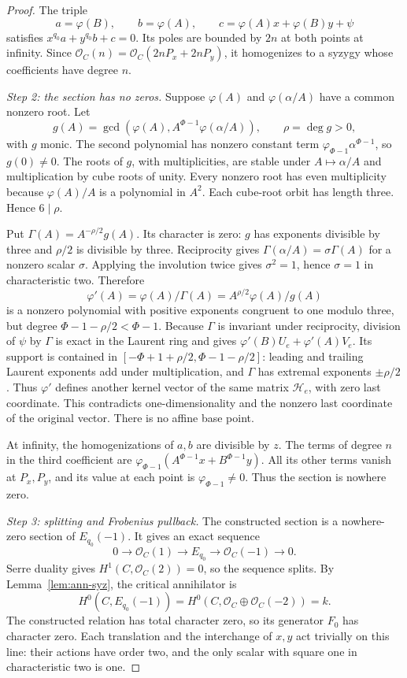 \documentclass[11pt,a4paper,reqno]{amsart}
\numberwithin{equation}{section}
\theoremstyle{plain}
\theoremstyle{definition}
\theoremstyle{remark}
\begin{document}
\begin{proof}
The triple
\[
a=\varphi(B),\qquad b=\varphi(A),\qquad
c=\varphi(A)x+\varphi(B)y+\psi
\]
satisfies $x^{q_0}a+y^{q_0}b+c=0$.
Its poles are bounded by $2n$ at both points at infinity.
Since $\mathcal O_C(n)=\mathcal O_C(2nP_x+2nP_y)$, it homogenizes
to a syzygy whose coefficients have degree $n$.

\emph{Step 2: the section has no zeros.}
Suppose $\varphi(A)$ and $\varphi(\alpha/A)$ have a common nonzero root.
Let
\[
g(A)=\gcd(\varphi(A),A^{\Phi-1}\varphi(\alpha/A)),\qquad \rho=\deg g>0,
\]
with $g$ monic. The second polynomial has nonzero constant term
$\varphi_{\Phi-1}\alpha^{\Phi-1}$, so $g(0)\ne0$.
The roots of $g$, with multiplicities, are stable under
$A\mapsto\alpha/A$ and multiplication by cube roots of unity.
Every nonzero root has even multiplicity because $\varphi(A)/A$
is a polynomial in $A^2$.
Each cube-root orbit has length three. Hence $6\mid\rho$.

Put $\Gamma(A)=A^{-\rho/2}g(A)$. Its character is zero: $g$ has exponents divisible
by three and $\rho/2$ is divisible by three. Reciprocity gives
$\Gamma(\alpha/A)=\sigma\Gamma(A)$ for a nonzero scalar $\sigma$. Applying the
involution twice gives $\sigma^2=1$, hence $\sigma=1$ in characteristic two.
Therefore
\[
\varphi'(A)=\varphi(A)/\Gamma(A)=A^{\rho/2}\varphi(A)/g(A)
\]
is a nonzero polynomial with positive exponents congruent to one modulo three, but
degree $\Phi-1-\rho/2<\Phi-1$. Because $\Gamma$ is invariant under reciprocity,
division of $\psi$ by $\Gamma$ is exact in the Laurent ring and gives
$\varphi'(B)U_e+\varphi'(A)V_e$. Its support is contained in
$[-\Phi+1+\rho/2,\Phi-1-\rho/2]$: leading and trailing Laurent exponents add under
multiplication, and $\Gamma$ has extremal exponents $\pm \rho/2$. Thus $\varphi'$
defines another kernel vector of the same matrix $\mathcal H_e$, with zero last
coordinate. This contradicts one-dimensionality and the nonzero last coordinate of
the original vector. There is no affine base point.

At infinity, the homogenizations of $a,b$ are divisible by $z$.
The terms of degree $n$ in the third coefficient are
$\varphi_{\Phi-1}(A^{\Phi-1}x+B^{\Phi-1}y)$.
All its other terms vanish at $P_x,P_y$, and its value at each point
is $\varphi_{\Phi-1}\ne0$. Thus the section is nowhere zero.

\emph{Step 3: splitting and Frobenius pullback.}
The constructed section is a nowhere-zero section of $E_{q_0}(-1)$. It gives an exact sequence
\[
0\longrightarrow\mathcal O_C(1)\longrightarrow E_{q_0}\longrightarrow\mathcal
O_C(-1)\longrightarrow0.
\]
Serre duality gives $H^1(C,\mathcal O_C(2))=0$, so the sequence splits.
By Lemma~\ref{lem:ann-syz}, the critical annihilator is
\[
H^0(C,E_{q_0}(-1))
=H^0(C,\mathcal O_C\oplus\mathcal O_C(-2))=k.
\]
The constructed relation has total character zero, so its generator
$F_0$ has character zero. Each translation and the interchange of
$x,y$ act trivially on this line: their actions have order two,
and the only scalar with square one in characteristic two is one.


\end{proof}
\end{document}

